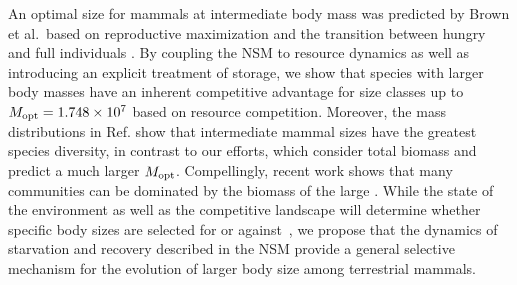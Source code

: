 \documentclass[twocolumn,preprintnumbers,amsmath,amssymb,superscriptaddress]{revtex4}
\begin{document}
\begin{bibunit}[unsrt]
  An optimal size for mammals at intermediate body mass was predicted by Brown et al.\ based on reproductive maximization and the transition between hungry and full individuals \cite{Brown:1993p708}. 
  By coupling the NSM to resource dynamics as well as introducing an explicit treatment of storage, we show that species with larger body masses have an inherent competitive advantage for size classes up to $M_{\rm opt}= 1.748\times10^7$ based on resource competition. Moreover, the mass distributions in Ref. \cite{Brown:1993p708} show that intermediate mammal sizes have the greatest species diversity, in contrast to our efforts, which consider total biomass and predict a much larger $M_{\rm opt}$.
  Compellingly, recent work shows that many communities can be dominated by the biomass of the large \cite{Hempson:2015hka}.
  While the state of the environment as well as the competitive landscape will determine whether specific body sizes are selected for or against~\citep{Saarinen:2014br}, we propose that the dynamics of starvation and recovery described in the NSM provide a general selective mechanism for the evolution of larger body size among terrestrial mammals.\\

   \\





\end{bibunit}
\end{document}
